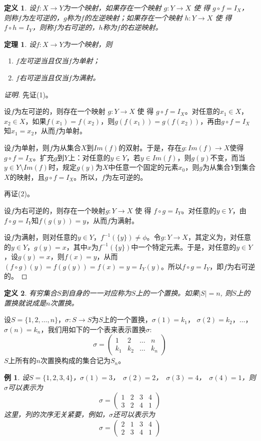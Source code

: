 \documentclass{book}[oneside]
\newtheorem{Def}{定义}[chapter]
\newtheorem{Thm}{定理}[chapter]
\newtheorem*{Example}{例}
\begin{document}
\begin{CJK*}{UTF8}{gbsn}
    \begin{Def}
    设$f:X\to Y$为一个映射，如果存在一个映射 $g:Y\to X$ 使 得 $g\circ f = I_X$，
    则称$f$为左可逆的，$g$称为$f$的左逆映射；如果存在一个映射
    $h:Y\to X$ 使 得 $f\circ h=I_Y$，则称$f$为右可逆的，$h$称为$f$的右逆映射。
  \end{Def}
  \begin{Thm}
    设$f:X\to Y$为一个映射，则
    \begin{enumerate}
    \item $f$左可逆当且仅当$f$为单射；
    \item $f$右可逆当且仅当$f$为满射。
    \end{enumerate}
  \end{Thm}
  \begin{proof}[证明]
    先证(1)。

设$f$为左可逆的，则存在一个映射 $g:Y\to X$ 使 得 $g\circ f = I_X$。对任意的$x_1\in X$，$x_2\in X$，如果$f(x_1)=f(x_2)$，则$g(f(x_1))=g(f(x_2))$，再由$g\circ f = I_{X}$知$x_1=x_2$，从而$f$为单射。

设$f$为单射，则$f$为从集合$X$到$Im(f)$的双射。于是，存在$g:Im(f)\to X$使得$g\circ f = I_X$。扩充$g$到$Y$上：对任意的$y\in Y$，若$y\in  Im(f)$，则$g(y)$不变，而当$y\in Y\setminus Im(f)$时，规定$g(y)$为$X$中任意一个固定的元素$x_0$，则$g$为从集合$Y$到集合$X$的映射，且$g\circ f = I_X$。所以，$f$为左可逆的。

再证(2)。

设$f$为右可逆的，则存在一个映射$g:Y\to X$ 使 得 $f\circ g=I_Y$。对任意的$y\in Y$，由$f\circ g = I_{Y}$知$f(g(y))=y$，从而$f$为满射。

设$f$为满射，则对任意的$y\in Y$，$f^{-1}(\{y\})\neq \phi$。令$g:Y\to X$，其定义为，对任意的$y\in Y$，$g(y)=x$，其中$x$为$f^{-1}(\{y\})$中一个特定元素。于是，对任意的$y\in Y$，设$g(y)=x$，则$f(x)=y$，从而$(f\circ g)(y) = f(g(y)) = f(x) = y = I_Y(y)$。所以$f\circ g=I_Y$，即$f$为右可逆的。
  \end{proof}

  \begin{Def}
    有穷集合$S$到自身的一一对应称为$S$上的一个置换。如果$|S| = n$, 则$S$上的置换就说成是$n$次置换。
  \end{Def}
设$S=\{1,2,\ldots,n\}$，$\sigma:S\to S$为$S$上的一个置换，$\sigma(1) = k_1$， $\sigma(2) = k_2$，$\ldots$，$\sigma(n) = k_n$，我们用如下的一个表来表示置换$\sigma$:
\[\sigma=\begin{pmatrix}1&2&\ldots&n\\k_1&k_2&\ldots&k_n\end{pmatrix}\]
$S$上所有的$n$次置换构成的集合记为$S_n$。
\begin{Example}
  设$S=\{1,2,3,4\}$，$\sigma(1) = 3$，　$\sigma(2) = 2$，　$\sigma(3) = 4$，　$\sigma(4) = 1$，则$\sigma$可以表示为
  \[\sigma=\begin{pmatrix}1&2&3&4\\3&2&4&1\end{pmatrix}\]
  这里，列的次序无关紧要，例如，$\sigma$还可以表示为
  \[\sigma=\begin{pmatrix}2&1&3&4\\2&3&4&1\end{pmatrix}\]
\end{Example}


\end{CJK*}
\end{document}
